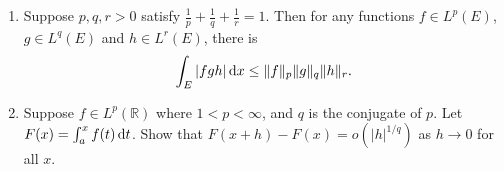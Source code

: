 \documentclass{article}
\begin{document}
\begin{enumerate}





\item Suppose $p,q,r > 0$ satisfy $\frac{1}{p} + \frac{1}{q} + \frac{1}{r} = 1$. Then for any functions $f \in L^{p}(E)$, $g \in L^{q}(E)$ and $h \in L^{r}(E)$, there is
\[
\int_{E} |f g h| \dif x \le \|f\|_{p} \|g\|_{q} \|h\|_{r}.
\]







\item Suppose $f \in L^{p}(\mathbb{R})$ where $1 < p < \infty$, and $q$ is the conjugate of $p$. Let $F(x) = \int_{a}^{x} f(t) \dif t$. Show that $F(x+h) - F(x) = o(|h|^{1/q})$ as $h \to 0$ for all $x$.






\end{enumerate}
\end{document}
